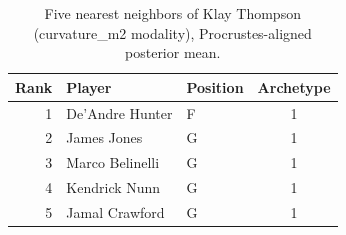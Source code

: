 \begin{table}[htbp]
  \centering\small
  \begin{tabular}{rllc}
    \toprule
    Rank & Player & Position & Archetype \\
    \midrule
    1 & De'Andre Hunter & F & 1 \\
    2 & James Jones & G & 1 \\
    3 & Marco Belinelli & G & 1 \\
    4 & Kendrick Nunn & G & 1 \\
    5 & Jamal Crawford & G & 1 \\
    \bottomrule
  \end{tabular}
  \caption{Five nearest neighbors of Klay Thompson (curvature_m2 modality), Procrustes-aligned posterior mean.}
  \label{tab:Klay_Thompson_neighbors_curvature_m2}
\end{table}

